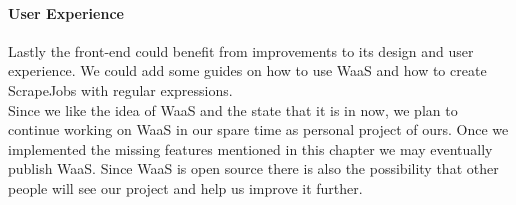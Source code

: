 \documentclass[titlepage, 12pt]{article}
\begin{document}
\paragraph{User Experience}
Lastly the front-end could benefit from improvements to its design and user experience. We could add some guides on how to use WaaS and how to create ScrapeJobs with regular expressions.\\
Since we like the idea of WaaS and the state that it is in now, we plan to continue working on WaaS in our spare time as personal project of ours. Once we implemented the missing features mentioned in this chapter we may eventually publish WaaS. Since WaaS is open source there is also the possibility that other people will see our project and help us improve it further.

\pagebreak

\listoftables
\listoffigures

\pagebreak



\end{document}
